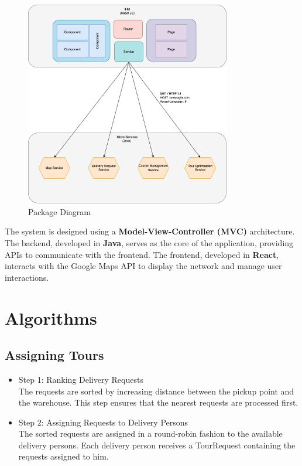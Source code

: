 \documentclass[a4paper]{article}
\begin{document}
\begin{figure}[H]
    \centering
    \includegraphics[width=0.8\textwidth]{images/archi.png}
    \caption{Package Diagram}
\end{figure}
The system is designed using a \textbf{Model-View-Controller (MVC)} architecture. The backend, developed in \textbf{Java}, serves as the core of the application, providing APIs to communicate with the frontend. The frontend, developed in \textbf{React}, interacts with the Google Maps API to display the network and manage user interactions.


\section{Algorithms}
\subsection{Assigning Tours}
\begin{itemize}
    \item Step 1: Ranking Delivery Requests \\
    The requests are sorted by increasing distance between the pickup point and the warehouse. This step ensures that the
    nearest requests are processed first.
    
    \item Step 2: Assigning Requests to Delivery Persons \\
    The sorted requests are assigned in a round-robin fashion to the available delivery persons. Each delivery person receives a TourRequest containing the requests assigned to him.
\end{itemize}
\end{document}
